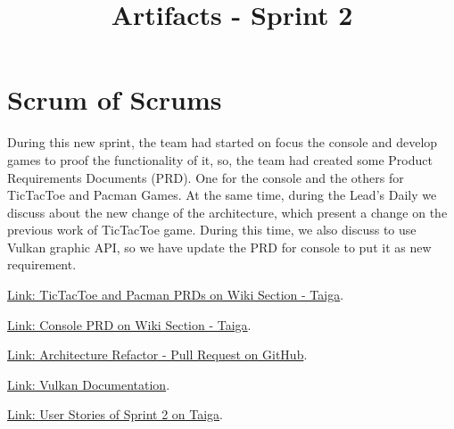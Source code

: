 \documentclass{article}
\title{Artifacts - Sprint 2}
\date{}
\begin{document}
\maketitle

\hypertarget{sos-s2} {
\section{Scrum of Scrums}\label{Scrum of Scrums} 
During this new sprint, the team had started on focus the console and develop 
games to proof the functionality of it, so, the team had created some Product 
Requirements Documents (PRD). One for the console and the others for TicTacToe 
and Pacman Games.
At the same time, during the Lead's Daily we discuss about the new change of 
the architecture, which present a change on the previous work of TicTacToe game. 
During this time, we also discuss to use Vulkan graphic API, so we have update 
the PRD for console to put it as new requirement.
}

\href{https://tree.taiga.io/project/joseluis-teran-coffeetime/wiki/fronted-team}{Link: TicTacToe and Pacman PRDs on Wiki Section - Taiga}.

\href{https://tree.taiga.io/project/joseluis-teran-coffeetime/wiki/backend-team}{Link: Console PRD on Wiki Section - Taiga}.

\href{https://github.com/Pending-Name-21/arquitecture/pull/5/files}{Link: Architecture Refactor - Pull Request on GitHub}.

\href{https://docs.vulkan.org/tutorial/latest/02_Development_environment.html#_linux}{Link: Vulkan Documentation}.

\href{https://tree.taiga.io/project/joseluis-teran-coffeetime/taskboard/sprint-2-12274}{Link: User Stories of Sprint 2 on Taiga}.
\end{document}

